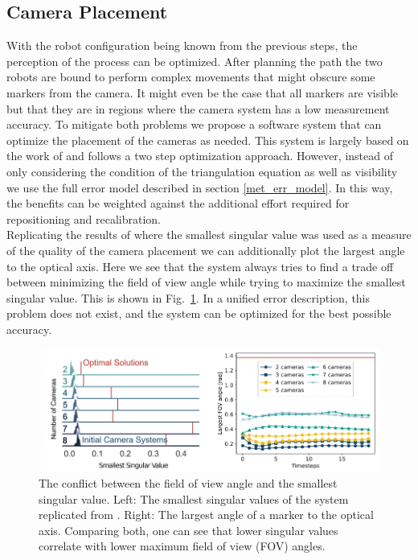 \documentclass[5p,times,procedia]{elsarticle}
\begin{document}
\subsection{Camera Placement}
With the robot configuration being known from the previous steps, the perception of the process can be optimized.
After planning the path the two robots are bound to perform complex movements that might obscure some markers from the camera.
It might even be the case that all markers are visible but that they are in regions where the camera system has a low measurement accuracy.
To mitigate both problems we propose a software system that can optimize the placement of the cameras as needed.
This system is largely based on the work of \cite{camera_placement} and follows a two step optimization approach.
However, instead of only considering the condition of the triangulation equation as well as visibility we use the full error model described in section \ref{met_err_model}.
In this way, the benefits can be weighted against the additional effort required  for repositioning and recalibration. \\
%
Replicating the results of \cite{camera_placement} where the smallest singular value was used as a measure of the quality of the camera placement we can additionally plot the largest angle to the optical axis.
Here we see that the system always tries to find a trade off between minimizing the field of view angle while trying to maximize the smallest singular value.
This is shown in Fig.~\ref{fig:fov_sv_conflict}.
In a unified error description, this problem does not exist, and the system can be optimized for the best possible accuracy.
\begin{figure}[hbt]
	\centering
	\includegraphics[width=0.95\columnwidth]{graphics/fov_sv_conflict.png}
	\caption{The conflict between the field of view angle and the smallest singular value. Left: The smallest singular values of the system replicated from \cite{camera_placement}. Right: The largest angle of a marker to the optical axis.
		Comparing both, one can see that lower singular values correlate with lower maximum field of view (FOV) angles.}
	\label{fig:fov_sv_conflict}
\end{figure}
%
\end{document}
